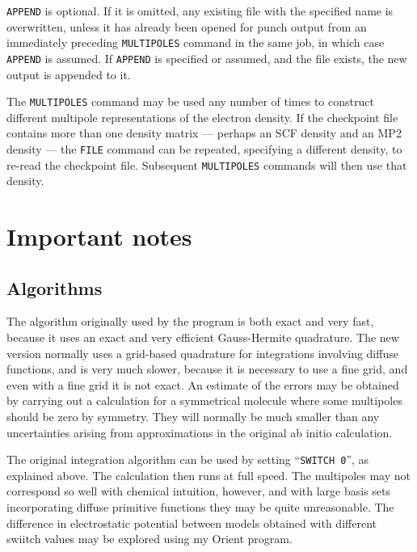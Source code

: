 \documentclass[12pt,txfonts]{paper}
\begin{document}
\verb/APPEND/ is optional. If it is omitted, any existing file with
the specified name is overwritten, unless it has already been opened
for punch output from an immediately preceding \verb/MULTIPOLES/
command in the same job, in which case \verb/APPEND/ is assumed. If
\verb/APPEND/ is specified or assumed, and the file exists, the new
output is appended to it.

The \verb/MULTIPOLES/ command may be used any number of times to
construct different multipole representations of the electron density.
If the checkpoint file contains more than one density matrix ---
perhaps an SCF density and an MP2 density --- the \verb/FILE/ command can be
repeated, specifying a different density, to re-read the checkpoint
file. Subsequent \verb/MULTIPOLES/ commands will then use that density.

\section{Important notes}

\subsection{Algorithms}

The algorithm originally used by the program is both exact and very fast,
because it uses an exact and very efficient Gauss-Hermite quadrature. 
The new version normally uses a grid-based quadrature for integrations
involving diffuse functions, and is very much slower, because it is
necessary to use a fine grid, and even with a fine grid it is not
exact. An estimate of the errors may be obtained by carrying out a
calculation for a symmetrical molecule where some multipoles should be
zero by symmetry. They will normally be much smaller than any
uncertainties arising from approximations in the original ab initio
calculation.

The original integration algorithm can be used by setting
``\verb+SWITCH 0+'', as explained above. The calculation then runs at
full speed. The multipoles may not correspond so well with chemical
intuition, however, and with large basis sets incorporating diffuse
primitive functions they may be quite unreasonable. The difference in
electrostatic potential between models obtained with different swiitch
values may be explored using my Orient program.

\end{document}
